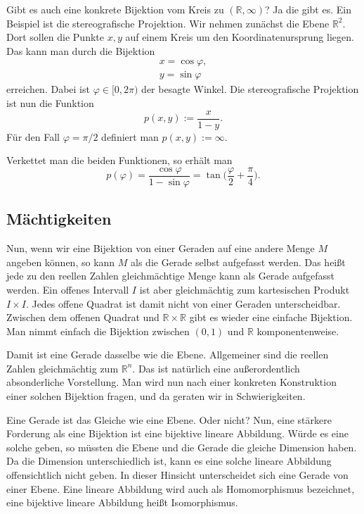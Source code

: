 \documentclass[a4paper,11pt,fleqn,twocolumn,twoside,dvipdfmx]{scrartcl}
\newcommand{\R}{\mathbb R}
\begin{document}
Gibt es auch eine konkrete Bijektion vom Kreis zu
$(\R,\infty)$? Ja die gibt es. Ein Beispiel ist die
stereografische Projektion. Wir nehmen zunächst die Ebene
$\R^2$. Dort sollen die Punkte $x,y$ auf einem Kreis
um den Koordinatenursprung liegen. Das kann man durch die Bijektion
\begin{gather}
x=\cos\varphi,\\
y=\sin\varphi
\end{gather}
erreichen. Dabei ist $\varphi\in{[0,2\pi)}$ der besagte Winkel.
Die stereografische Projektion ist nun die Funktion
\begin{equation}
p(x,y) := \frac{x}{1-y}.
\end{equation}
Für den Fall $\varphi=\pi/2$ definiert man $p(x,y):=\infty$.

Verkettet man die beiden Funktionen, so erhält man
\begin{equation}
p(\varphi) = \frac{\cos\varphi}{1-\sin\varphi}
= \tan\Big(\frac{\varphi}{2}+\frac{\pi}{4}\Big).
\end{equation}

\subsection{Mächtigkeiten}

Nun, wenn wir eine Bijektion von einer Geraden auf eine andere Menge
$M$ angeben können, so kann $M$ als die Gerade selbst aufgefasst
werden. Das heißt jede zu den reellen Zahlen gleichmächtige Menge
kann als Gerade aufgefasst werden. Ein offenes Intervall $I$ ist
aber gleichmächtig zum kartesischen Produkt $I\times I$. Jedes
offene Quadrat ist damit nicht von einer Geraden unterscheidbar.
Zwischen dem offenen Quadrat und $\R\times\R$ gibt
es wieder eine einfache Bijektion. Man nimmt einfach die Bijektion
zwischen $(0,1)$ und $\R$ komponentenweise.

Damit ist eine Gerade dasselbe wie die Ebene. Allgemeiner sind die
reellen Zahlen gleichmächtig zum $\R^n$. Das ist natürlich
eine außerordentlich absonderliche Vorstellung. Man wird nun nach
einer konkreten Konstruktion einer solchen Bijektion fragen, und
da geraten wir in Schwierigkeiten.

Eine Gerade ist das Gleiche wie eine Ebene. Oder nicht?
Nun, eine stärkere Forderung als eine Bijektion ist eine
bijektive lineare Abbildung. Würde es eine solche geben, so müssten
die Ebene und die Gerade die gleiche Dimension haben. Da die Dimension
unterschiedlich ist, kann es eine solche lineare Abbildung
offensichtlich nicht geben. In dieser Hinsicht unterscheidet sich
eine Gerade von einer Ebene. Eine lineare Abbildung wird auch als
Homomorphismus bezeichnet, eine bijektive lineare Abbildung heißt
Isomorphismus.
\end{document}
